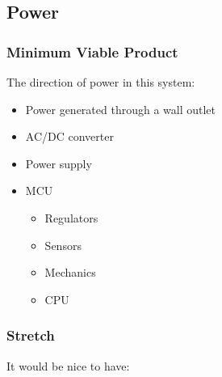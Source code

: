 \subsection{Power}
\subsubsection{Minimum Viable Product}
The direction of power in this system:
\begin{itemize}
  \item Power generated through a wall outlet
  \item AC/DC converter 
  \item Power supply
  \item MCU
  \begin{itemize}
    \item Regulators
    \item Sensors
    \item Mechanics
    \item CPU
  \end{itemize}
\end{itemize}
\subsubsection{Stretch}
It would be nice to have:
